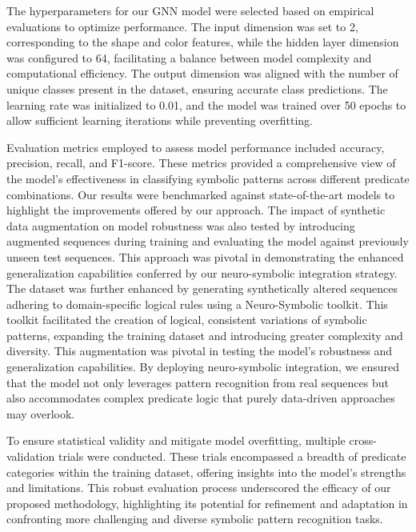 \documentclass{article}
\begin{document}
The hyperparameters for our GNN model were selected based on empirical evaluations to optimize performance. The input dimension was set to 2, corresponding to the shape and color features, while the hidden layer dimension was configured to 64, facilitating a balance between model complexity and computational efficiency. The output dimension was aligned with the number of unique classes present in the dataset, ensuring accurate class predictions. The learning rate was initialized to 0.01, and the model was trained over 50 epochs to allow sufficient learning iterations while preventing overfitting.

Evaluation metrics employed to assess model performance included accuracy, precision, recall, and F1-score. These metrics provided a comprehensive view of the model's effectiveness in classifying symbolic patterns across different predicate combinations. Our results were benchmarked against state-of-the-art models to highlight the improvements offered by our approach. The impact of synthetic data augmentation on model robustness was also tested by introducing augmented sequences during training and evaluating the model against previously unseen test sequences. This approach was pivotal in demonstrating the enhanced generalization capabilities conferred by our neuro-symbolic integration strategy.
The dataset was further enhanced by generating synthetically altered sequences adhering to domain-specific logical rules using a Neuro-Symbolic toolkit. This toolkit facilitated the creation of logical, consistent variations of symbolic patterns, expanding the training dataset and introducing greater complexity and diversity. This augmentation was pivotal in testing the model's robustness and generalization capabilities. By deploying neuro-symbolic integration, we ensured that the model not only leverages pattern recognition from real sequences but also accommodates complex predicate logic that purely data-driven approaches may overlook.

To ensure statistical validity and mitigate model overfitting, multiple cross-validation trials were conducted. These trials encompassed a breadth of predicate categories within the training dataset, offering insights into the model's strengths and limitations. This robust evaluation process underscored the efficacy of our proposed methodology, highlighting its potential for refinement and adaptation in confronting more challenging and diverse symbolic pattern recognition tasks.
\end{document}
